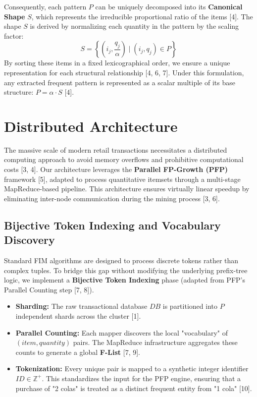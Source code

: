 \documentclass[10pt, twocolumn]{article}
\begin{document}
Consequently, each pattern $P$ can be uniquely decomposed into its
\textbf{Canonical Shape} $S$, which represents the irreducible proportional
ratio of the items [4]. The shape $S$ is derived by normalizing each quantity
in the pattern by the scaling factor:
\begin{equation}
    S = \left\{ \left(i_j, \frac{q_j}{\alpha}\right) \mid (i_j, q_j) \in P \right\}
\end{equation}
By sorting these items in a fixed lexicographical order, we ensure a unique
representation for each structural relationship [4, 6, 7]. Under this
formulation, any extracted frequent pattern is represented as a scalar multiple
of its base structure: $P = \alpha \cdot S$ [4].

\section{Distributed Architecture}

The massive scale of modern retail transactions necessitates a distributed
computing approach to avoid memory overflows and prohibitive computational
costs [3, 4]. Our architecture leverages the \textbf{Parallel FP-Growth (PFP)}
framework [5], adapted to process quantitative itemsets through a multi-stage
MapReduce-based pipeline. This architecture ensures virtually linear speedup by
eliminating inter-node communication during the mining process [3, 6].

\subsection{Bijective Token Indexing and Vocabulary Discovery}
Standard FIM algorithms are designed to process discrete tokens rather than
complex tuples. To bridge this gap without modifying the underlying prefix-tree
logic, we implement a \textbf{Bijective Token Indexing} phase (adapted from
PFP's Parallel Counting step [7, 8]).
\begin{itemize}
    \item \textbf{Sharding:} The raw transactional database $DB$ is partitioned
          into $P$ independent shards across the cluster [1].
    \item \textbf{Parallel Counting:} Each mapper discovers the local
          "vocabulary" of $(item, quantity)$ pairs. The MapReduce infrastructure
          aggregates these counts to generate a global \textbf{F-List} [7, 9].
    \item \textbf{Tokenization:} Every unique pair is mapped to a synthetic
          integer identifier $ID \in \mathbb{Z}^+$. This standardizes the input for the
          PFP engine, ensuring that a purchase of "2 colas" is treated as a distinct
          frequent entity from "1 cola" [10].
\end{itemize}
\end{document}
